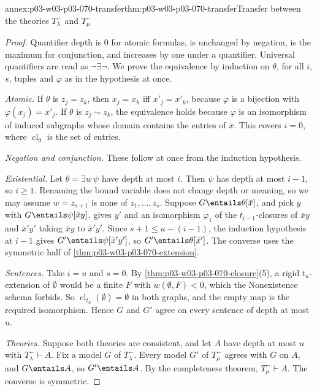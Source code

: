 \begin{annexitem}{annex:p03-w03-p03-070-transfer}{thm:p03-w03-p03-070-transfer}{Transfer between the theories \(T^-_\lambda\) and \(T^-_\mu\)}
\begin{proof}
Quantifier depth is \(0\) for atomic formulas, is unchanged by negation, is
the maximum for conjunction, and increases by one under a quantifier.
Universal quantifiers are read as \(\neg\exists\neg\).  We prove the
equivalence by induction on \(\theta\), for all \(i\), \(s\), tuples and
\(\varphi\) as in the hypothesis at once.

\emph{Atomic.}  If \(\theta\) is \(z_j=z_k\), then \(x_j=x_k\) iff
\(x'_j=x'_k\), because \(\varphi\) is a bijection with \(\varphi(x_j)=x'_j\).
If \(\theta\) is \(z_j\sim z_k\), the equivalence holds because \(\varphi\) is
an isomorphism of induced subgraphs whose domain contains the entries of
\(\bar x\).  This covers \(i=0\), where \(\operatorname{cl}_0\) is the set of
entries.

\emph{Negation and conjunction.}  These follow at once from the induction
hypothesis.

\emph{Existential.}  Let \(\theta=\exists w\,\psi\) have depth at most \(i\).
Then \(\psi\) has depth at most \(i-1\), so \(i\geq1\).  Renaming the bound
variable does not change depth or meaning, so we may assume \(w=z_{s+1}\) is
none of \(z_1,\ldots,z_s\).  Suppose \(G\entails\theta[\bar x]\), and pick
\(y\) with \(G\entails\psi[\bar xy]\).
 gives \(y'\) and an isomorphism
\(\varphi_1\) of the \(t_{i-1}\)-closures of \(\bar xy\) and \(\bar x'y'\)
taking \(\bar xy\) to \(\bar x'y'\).  Since \(s+1\leq u-(i-1)\), the induction
hypothesis at \(i-1\) gives \(G'\entails\psi[\bar x'y']\), so
\(G'\entails\theta[\bar x']\).  The converse uses the symmetric half of
\cref{thm:p03-w03-p03-070-extension}.

\emph{Sentences.}  Take \(i=u\) and \(s=0\).  By
\cref{thm:p03-w03-p03-070-closure}(5), a rigid \(t_u\)-extension of
\(\emptyset\) would be a finite \(F\) with \(w(\emptyset,F)<0\), which the
Nonexistence schema forbids.  So \(\operatorname{cl}_{t_u}(\emptyset)=\emptyset\)
in both graphs, and the empty map is the required isomorphism.  Hence \(G\)
and \(G'\) agree on every sentence of depth at most \(u\).

\emph{Theories.}  Suppose both theories are consistent, and let \(A\) have
depth at most \(u\) with \(T^-_\lambda\vdash A\).  Fix a model \(G\) of
\(T^-_\lambda\).  Every model \(G'\) of \(T^-_\mu\) agrees with \(G\) on
\(A\), and \(G\entails A\), so \(G'\entails A\).  By the completeness theorem,
\(T^-_\mu\vdash A\).  The converse is symmetric.
\end{proof}
\end{annexitem}

